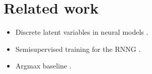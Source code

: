 \section{Related work}
\begin{itemize}
  \item Discrete latent variables in neural models \citep{Miao+2016,yin2018structvae}.
  \item Semisupervised training for the RNNG \citep{Cheng+2017:RNNG-VI}.
  \item Argmax baseline \cite{Rennie+2017:argmax-baseline}.
\end{itemize}
